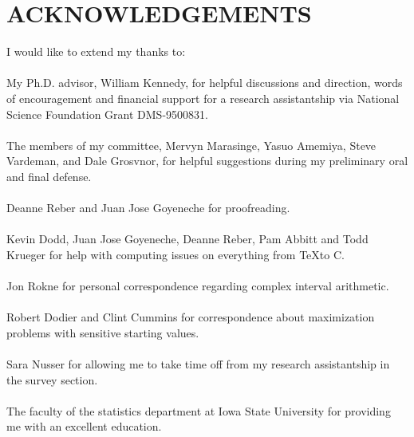 \chapter*{ACKNOWLEDGEMENTS }

I would like to extend my thanks to:\\
\\
My Ph.D. advisor, William Kennedy, for helpful discussions and
direction, words of encouragement and financial 
support for a research assistantship via 
National Science Foundation Grant DMS-9500831.\\
\\
The members of my committee, Mervyn Marasinge, Yasuo Amemiya,
Steve Vardeman, and Dale Grosvnor, for helpful suggestions during my
preliminary oral and final defense.\\
\\
Deanne Reber and Juan Jose Goyeneche for proofreading.\\
\\
Kevin Dodd, Juan Jose Goyeneche, Deanne Reber, Pam Abbitt
and Todd Krueger for help with computing issues on everything from \TeX to C.\\
\\
Jon Rokne for personal correspondence regarding complex interval
arithmetic.\\
\\
Robert Dodier and Clint Cummins for correspondence about
maximization problems with sensitive starting values.\\
\\
Sara Nusser for allowing me to take time off from my research
assistantship in the survey section.\\
\\
The faculty of the statistics department at Iowa State
University for providing me with an excellent education.\\

